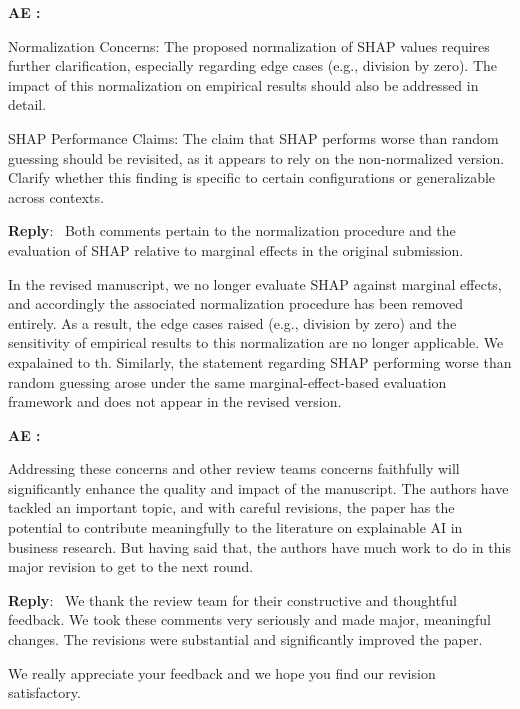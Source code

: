 \documentclass[11pt]{article}
\newcounter{se}[section]
\newcounter{aed}[section]
\newenvironment{aed}[1][]{%
    \refstepcounter{aed}\par\medskip\noindent%
    \textbf{AE \theaed: #1}\rmfamily\itshape%
}{\medskip}
\newenvironment{reply}
 {\par\medskip \noindent \begin{sf}\textbf{Reply}:\ }
 {\medskip \end{sf}}
\begin{document}
\begin{aed}
    Normalization Concerns: The proposed normalization of SHAP values requires further clarification, especially regarding edge cases (e.g., division by zero). The impact of this normalization on empirical results should also be addressed in detail.

        SHAP Performance Claims: The claim that SHAP performs worse than random guessing should be revisited, as it appears to rely on the non-normalized version. Clarify whether this finding is specific to certain configurations or generalizable across contexts.
    \end{aed}
\begin{reply}
Both comments pertain to the normalization procedure and the evaluation of SHAP relative to marginal effects in the original submission.

In the revised manuscript, we no longer evaluate SHAP against marginal effects, and accordingly the associated normalization procedure has been removed entirely. As a result, the edge cases raised (e.g., division by zero) and the sensitivity of empirical results to this normalization are no longer applicable. We expalained to th.
Similarly, the statement regarding SHAP performing worse than random guessing arose under the same marginal-effect-based evaluation framework and does not appear in the revised version. 


\end{reply}

\begin{aed}
    Addressing these concerns and other review teams concerns faithfully will significantly enhance the quality and impact of the manuscript. The authors have tackled an important topic, and with careful revisions, the paper has the potential to contribute meaningfully to the literature on explainable AI in business research. But having said that, the authors have much work to do in this major revision to get to the next round.
\end{aed}

\begin{reply}
We thank the review team for their constructive and thoughtful feedback. We took these comments very seriously and made major, meaningful changes. The revisions were substantial and  significantly improved the paper. 

We really appreciate your feedback and we hope you find our revision satisfactory.
\end{reply}
\end{document}
